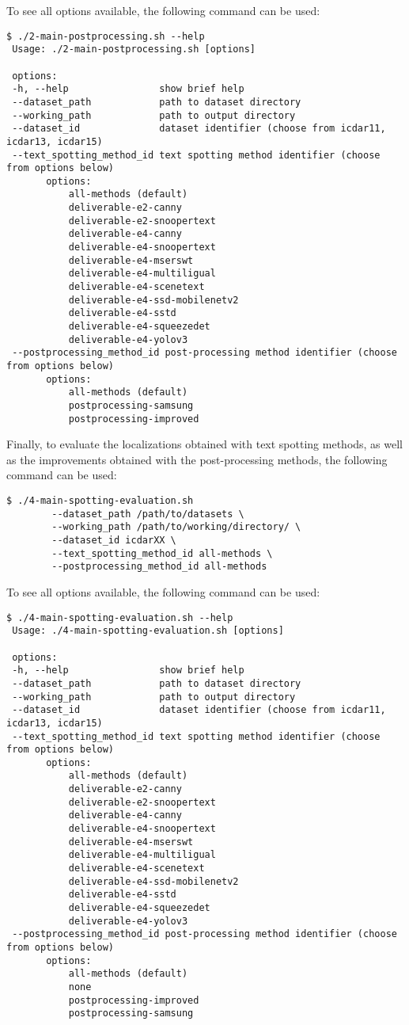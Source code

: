 To see all options available, the following command can be used:
\begin{lstlisting}[style=fancyterminal]
 $ ./2-main-postprocessing.sh --help
 Usage: ./2-main-postprocessing.sh [options]
 
 options:
 -h, --help                show brief help
 --dataset_path            path to dataset directory
 --working_path            path to output directory
 --dataset_id              dataset identifier (choose from icdar11, icdar13, icdar15)
 --text_spotting_method_id text spotting method identifier (choose from options below)
       options:
           all-methods (default)
           deliverable-e2-canny
           deliverable-e2-snoopertext
           deliverable-e4-canny
           deliverable-e4-snoopertext
           deliverable-e4-mserswt
           deliverable-e4-multiligual
           deliverable-e4-scenetext
           deliverable-e4-ssd-mobilenetv2
           deliverable-e4-sstd
           deliverable-e4-squeezedet
           deliverable-e4-yolov3
 --postprocessing_method_id post-processing method identifier (choose from options below)
       options:
           all-methods (default)
           postprocessing-samsung
           postprocessing-improved
\end{lstlisting}

Finally, to evaluate the localizations obtained with text spotting methods, as well as the improvements obtained with the post-processing methods, the following command can be used:
\begin{lstlisting}[style=fancyterminal]
 $ ./4-main-spotting-evaluation.sh 
        --dataset_path /path/to/datasets \
        --working_path /path/to/working/directory/ \
        --dataset_id icdarXX \
        --text_spotting_method_id all-methods \
        --postprocessing_method_id all-methods
\end{lstlisting}

To see all options available, the following command can be used:
\begin{lstlisting}[style=fancyterminal]
 $ ./4-main-spotting-evaluation.sh --help
 Usage: ./4-main-spotting-evaluation.sh [options]
 
 options:
 -h, --help                show brief help
 --dataset_path            path to dataset directory
 --working_path            path to output directory
 --dataset_id              dataset identifier (choose from icdar11, icdar13, icdar15)
 --text_spotting_method_id text spotting method identifier (choose from options below)
       options:
           all-methods (default)
           deliverable-e2-canny
           deliverable-e2-snoopertext
           deliverable-e4-canny
           deliverable-e4-snoopertext
           deliverable-e4-mserswt
           deliverable-e4-multiligual
           deliverable-e4-scenetext
           deliverable-e4-ssd-mobilenetv2
           deliverable-e4-sstd
           deliverable-e4-squeezedet
           deliverable-e4-yolov3
 --postprocessing_method_id post-processing method identifier (choose from options below)
       options:
           all-methods (default)
           none
           postprocessing-improved
           postprocessing-samsung
\end{lstlisting}

